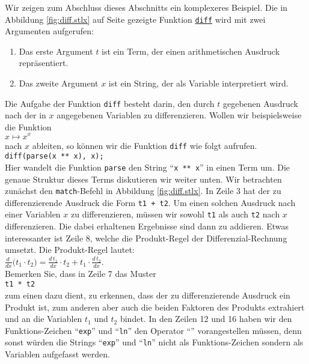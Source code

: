 \noindent
Wir zeigen zum Abschluss dieses Abschnitts ein komplexeres Beispiel.  Die in Abbildung
\ref{fig:diff.stlx} auf Seite \pageref{fig:diff.stlx} gezeigte Funktion
\href{https://github.com/karlstroetmann/Logik/blob/master/SetlX/diff.stlx}{\texttt{diff}}
wird mit zwei Argumenten aufgerufen:
\begin{enumerate}
\item Das erste  Argument $t$ ist ein Term, der einen arithmetischen Ausdruck repr\"{a}sentiert.
\item Das zweite Argument $x$ ist ein String, der als Variable interpretiert wird.
\end{enumerate}
Die Aufgabe der Funktion \texttt{diff} besteht darin, den durch $t$ gegebenen Ausdruck nach der
in $x$ angegebenen Variablen zu differenzieren.  Wollen wir beispielsweise die Funktion
\\[0.2cm]
\hspace*{1.3cm}
$x \mapsto x^x$
\\[0.2cm]
nach $x$ ableiten, so k\"{o}nnen wir die Funktion \texttt{diff} wie folgt aufrufen.
\\[0.2cm]
\hspace*{1.3cm}
\texttt{diff(parse(x ** x), x);}
\\[0.2cm]
Hier wandelt die Funktion \texttt{parse} den String ``\texttt{x ** x}'' in einen Term um.  Die
genaue Struktur dieses Terms diskutieren wir weiter unten.  Wir betrachten
zun\"{a}chst den \texttt{match}-Befehl in  Abbildung \ref{fig:diff.stlx}.  
In Zeile  3 hat der zu differenzierende Ausdruck die Form
\texttt{t1 + t2}.  Um einen solchen Ausdruck nach einer Variablen $x$ zu differenzieren, m\"{u}ssen wir
sowohl  \texttt{t1} als auch \texttt{t2} nach $x$ differenzieren.  Die dabei erhaltenen Ergebnisse
sind dann zu addieren.  Etwas interessanter ist Zeile 8, welche die Produkt-Regel der
Differenzial-Rechnung umsetzt.  Die Produkt-Regel lautet:
\\[0.2cm]
\hspace*{1.3cm}
$\displaystyle \frac{d\;}{dx} \bigl(t_1 \cdot t_2\bigr) = \frac{d\, t_1}{dx} \cdot t_2 + t_1 \cdot \frac{d\,t_2}{dx}$.
\\[0.2cm]
Bemerken Sie, dass in Zeile 7 das Muster
\\[0.2cm]
\hspace*{1.3cm}
\texttt{t1 * t2}
\\[0.2cm]
zum einen dazu dient, zu erkennen, dass der zu differenzierende Ausdruck ein Produkt ist, zum
anderen aber auch die beiden Faktoren des Produkts extrahiert und an die Variablen $t_1$ und $t_2$ bindet.
In den Zeilen  12 und 16 haben wir den Funktions-Zeichen ``\texttt{exp}'' und ``\texttt{ln}'' den
 Operator ``\texttt{}'' vorangestellen m\"{u}ssen, denn sonst w\"{u}rden die Strings
 ``\texttt{exp}'' und ``\texttt{ln}'' nicht als Funktions-Zeichen sondern als Variablen
 aufgefasst werden. 

